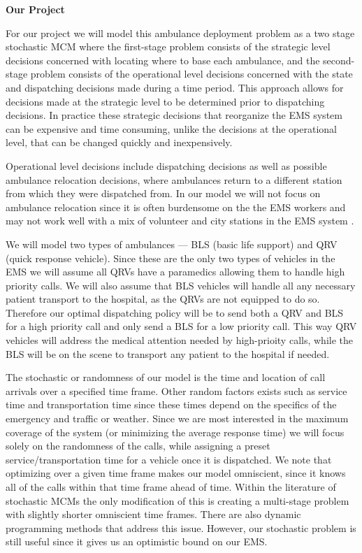 \documentclass[12pt]{report}
\begin{document}
\noindent{}\textbf{Our Project}

For our project we will model this ambulance deployment problem as a two stage stochastic MCM where the first-stage problem consists of the  strategic level decisions concerned with locating where to base each ambulance, and the second-stage problem consists of the operational level decisions concerned with the state and dispatching decisions made during a time period. This approach allows for decisions made at the strategic level to be determined prior to dispatching decisions. In practice these strategic decisions that reorganize the EMS system can be expensive and time consuming, unlike the decisions at the operational level, that can be changed quickly and inexpensively.

Operational level decisions include dispatching decisions as well as possible ambulance relocation decisions, where ambulances return to a different station from which they were dispatched from. In our model we will not focus on ambulance relocation since it is often burdensome on the the EMS workers and may not work well with a mix of volunteer and city stations in the EMS system \citep{belanger2018recent}.

We will model two types of ambulances --- BLS (basic life support) and QRV (quick response vehicle). Since these are the only two types of vehicles in the EMS we will assume all QRVs have a paramedics allowing them to handle high priority calls. We will also assume that BLS vehicles will handle all any necessary patient transport to the hospital, as the QRVs are not equipped to do so. Therefore our optimal dispatching policy will be to send both a QRV and BLS for a high priority call and only send a BLS for a low priority call. This way QRV vehicles will address the medical attention needed by high-prioity calls, while the BLS will be on the scene to transport any patient to the hospital if needed.

The stochastic or randomness of our model is the time and location of call arrivals over a specified time frame. Other random factors exists such as service time and transportation time since these times depend on the specifics of the emergency and traffic or weather. Since we are most interested in the maximum coverage of the system (or minimizing the average response time) we will focus solely on the randomness of the calls, while assigning a preset service/transportation time for a vehicle once it is dispatched. We note that optimizing over a given time frame makes our model omniscient, since it knows all of the calls within that time frame ahead of time. Within the literature of stochastic MCMs the only modification of this is creating a multi-stage problem with slightly shorter omniscient time frames. There are also dynamic programming methods that address this issue. However, our stochastic problem is still useful since it gives us an optimistic bound on our EMS.
\end{document}
